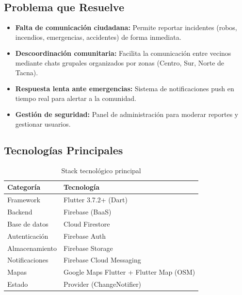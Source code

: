 \documentclass[12pt,a4paper]{article}
\begin{document}
\subsection{Problema que Resuelve}

\begin{itemize}
    \item \textbf{Falta de comunicación ciudadana:} Permite reportar incidentes (robos, incendios, emergencias, accidentes) de forma inmediata.
    \item \textbf{Descoordinación comunitaria:} Facilita la comunicación entre vecinos mediante chats grupales organizados por zonas (Centro, Sur, Norte de Tacna).
    \item \textbf{Respuesta lenta ante emergencias:} Sistema de notificaciones push en tiempo real para alertar a la comunidad.
    \item \textbf{Gestión de seguridad:} Panel de administración para moderar reportes y gestionar usuarios.
\end{itemize}

\subsection{Tecnologías Principales}

\begin{table}[h]
\centering
\begin{tabular}{|l|l|}
\hline
\textbf{Categoría} & \textbf{Tecnología} \\
\hline
Framework & Flutter 3.7.2+ (Dart) \\
Backend & Firebase (BaaS) \\
Base de datos & Cloud Firestore \\
Autenticación & Firebase Auth \\
Almacenamiento & Firebase Storage \\
Notificaciones & Firebase Cloud Messaging \\
Mapas & Google Maps Flutter + Flutter Map (OSM) \\
Estado & Provider (ChangeNotifier) \\
\hline
\end{tabular}
\caption{Stack tecnológico principal}
\end{table}

\end{document}
